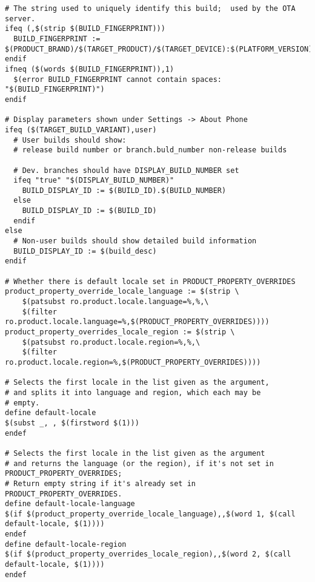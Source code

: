 \documentclass[12pt,a4paper]{article}
\begin{document}
\begin{verbatim}
# The string used to uniquely identify this build;  used by the OTA server.
ifeq (,$(strip $(BUILD_FINGERPRINT)))
  BUILD_FINGERPRINT := $(PRODUCT_BRAND)/$(TARGET_PRODUCT)/$(TARGET_DEVICE):$(PLATFORM_VERSION)/$(BUILD_ID)/$(BUILD_NUMBER):$(TARGET_BUILD_VARIANT)/$(BUILD_VERSION_TAGS)
endif
ifneq ($(words $(BUILD_FINGERPRINT)),1)
  $(error BUILD_FINGERPRINT cannot contain spaces: "$(BUILD_FINGERPRINT)")
endif

# Display parameters shown under Settings -> About Phone
ifeq ($(TARGET_BUILD_VARIANT),user)
  # User builds should show:
  # release build number or branch.buld_number non-release builds

  # Dev. branches should have DISPLAY_BUILD_NUMBER set
  ifeq "true" "$(DISPLAY_BUILD_NUMBER)"
    BUILD_DISPLAY_ID := $(BUILD_ID).$(BUILD_NUMBER)
  else
    BUILD_DISPLAY_ID := $(BUILD_ID)
  endif
else
  # Non-user builds should show detailed build information
  BUILD_DISPLAY_ID := $(build_desc)
endif

# Whether there is default locale set in PRODUCT_PROPERTY_OVERRIDES
product_property_override_locale_language := $(strip \
    $(patsubst ro.product.locale.language=%,%,\
    $(filter ro.product.locale.language=%,$(PRODUCT_PROPERTY_OVERRIDES))))
product_property_overrides_locale_region := $(strip \
    $(patsubst ro.product.locale.region=%,%,\
    $(filter ro.product.locale.region=%,$(PRODUCT_PROPERTY_OVERRIDES))))

# Selects the first locale in the list given as the argument,
# and splits it into language and region, which each may be
# empty.
define default-locale
$(subst _, , $(firstword $(1)))
endef

# Selects the first locale in the list given as the argument
# and returns the language (or the region), if it's not set in PRODUCT_PROPERTY_OVERRIDES;
# Return empty string if it's already set in PRODUCT_PROPERTY_OVERRIDES.
define default-locale-language
$(if $(product_property_override_locale_language),,$(word 1, $(call default-locale, $(1))))
endef
define default-locale-region
$(if $(product_property_overrides_locale_region),,$(word 2, $(call default-locale, $(1))))
endef


\end{verbatim}
\end{document}
